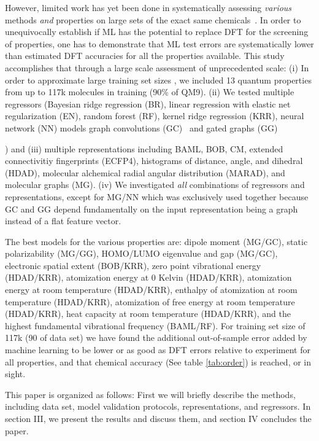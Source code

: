\documentclass[reprint, superscriptaddress,
amsmath,amssymb, aps, prb,
]{revtex4-1}
\begin{document}
However, limited work has yet been done in systematically assessing {\em various} methods {\em and} properties on large sets of the exact same chemicals~\cite{AssessmentMLJCTC2013}.
In order to unequivocally establish if ML has the potential to replace DFT for the screening of properties, 
one has to demonstrate that ML test errors
are systematically lower than estimated DFT accuracies for all the properties available.
This study accomplishes that through a large scale assessment of unprecedented scale: 
(i) In order to approximate large training set sizes , we included  13 quantum properties from up to 117k molecules in training (90\% of QM9).
(ii) We tested multiple regressors (Bayesian ridge regression (BR), linear regression with elastic net regularization (EN), random forest (RF), kernel ridge regression (KRR), neural network (NN) models graph convolutions (GC)~\cite{kearnes2016molecular} and gated graphs (GG)~{\cite{yujia}) and 
(iii) multiple representations including BAML, BOB, CM, extended connectivitiy fingerprints (ECFP4), histograms of distance, angle, and dihedral (HDAD), molecular alchemical radial angular distribution (MARAD), and
molecular graphs (MG). 
(iv) We investigated {\em all} combinations of regressors and representations, except for MG/NN which was exclusively used together because GC and GG depend fundamentally on the input representation being a graph instead of a flat feature vector.

The best models for the various properties are:
dipole moment (MG/GC), 
static polarizability (MG/GG), 
HOMO/LUMO eigenvalue and gap (MG/GC), 
electronic spatial extent (BOB/KRR), 
zero point vibrational energy (HDAD/KRR), 
atomization energy at 0 Kelvin (HDAD/KRR), 
atomization energy at room temperature (HDAD/KRR), 
enthalpy of atomization at room temperature (HDAD/KRR), 
atomization of free energy at room temperature (HDAD/KRR), 
heat capacity at room temperature (HDAD/KRR),
and the highest fundamental vibrational frequency (BAML/RF).
For training set size of 117k (90 of data set) we have found the additional out-of-sample error added by machine learning to be lower or as good as DFT errors 
relative to experiment for all properties, 
and that chemical accuracy (See table \ref{tab:order}) is reached, or in sight.

This paper is organized as follows: First we will briefly describe the methods, including data set, model validation protocols, representations, and regressors. In section III, we present the results and discuss them, and section IV concludes the paper. 

}
\end{document}

